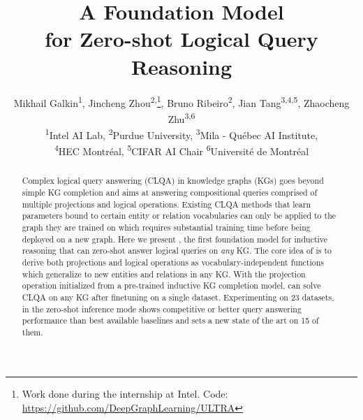 \documentclass{article}
\title{A Foundation Model \\ for Zero-shot Logical Query Reasoning}
\author{%
  Mikhail Galkin\textsuperscript{1}, Jincheng Zhou\textsuperscript{2,}\thanks{Work done during the internship at Intel. Code: \url{https://github.com/DeepGraphLearning/ULTRA}}, Bruno Ribeiro\textsuperscript{2}, Jian Tang\textsuperscript{3,4,5}, Zhaocheng Zhu\textsuperscript{3,6} \\
  \textsuperscript{1}Intel AI Lab, 
  \textsuperscript{2}Purdue University, 
  \textsuperscript{3}Mila - Qu\'ebec AI Institute, \\
  \textsuperscript{4}HEC Montr\'eal, \textsuperscript{5}CIFAR AI Chair
  \textsuperscript{6}Universit\'e de Montr\'eal 
}
\theoremstyle{plain}
\theoremstyle{definition}
\theoremstyle{remark}
\begin{document}
\maketitle

\vspace{-2em}
\begin{abstract}
Complex logical query answering (CLQA) in knowledge graphs (KGs) goes beyond simple KG completion and aims at answering compositional queries comprised of multiple projections and logical operations.
Existing CLQA methods that learn parameters bound to certain entity or relation vocabularies can only be applied to the  graph they are trained on which requires substantial training time before being deployed on a new graph.
Here we present \method, the first foundation model for inductive reasoning that can zero-shot answer logical queries on \emph{any} KG.
The core idea of \method is to derive both projections and logical operations as vocabulary-independent functions which generalize to new entities and relations in any KG.
With the projection operation initialized from a pre-trained inductive KG 
completion
model, \method can solve CLQA on any KG 
after finetuning
on a single dataset.
Experimenting on 23 datasets, \method in the zero-shot inference mode shows competitive or better query answering performance than best available baselines and sets a new state of the art on 15 of them.
\end{abstract}














\newpage
\appendix
\onecolumn


%
\end{document}
